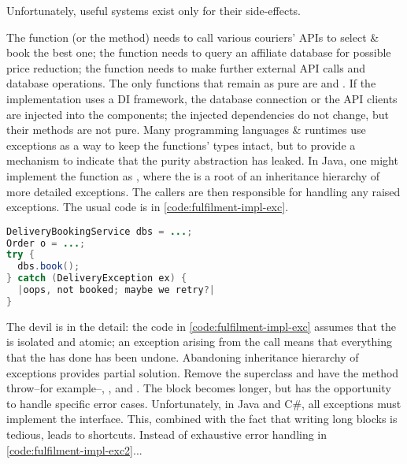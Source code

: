 Unfortunately, useful systems exist only for their side-effects.

The  function (or the  method) needs to call various couriers' APIs to select \& book the best one; the  function needs to query an affiliate database for possible price reduction; the  function needs to make further external API calls and database operations. The only functions that remain as pure are  and . If the implementation uses a DI framework, the database connection or the API clients are injected into the components; the injected dependencies do not change, but their methods are not pure. Many programming languages \& runtimes use exceptions as a way to keep the functions' types intact, but to provide a mechanism to indicate that the purity abstraction has leaked. In Java, one might implement the  function as , where the  is a root of an inheritance hierarchy of more detailed exceptions. The callers are then responsible for handling any raised exceptions. The usual code is in \autoref{code:fulfilment-impl-exc}.

\begin{lstlisting}[caption={Exceptions}, label={code:fulfilment-impl-exc}, language=Java, escapechar=|]
DeliveryBookingService dbs = ...;
Order o = ...;
try {
  dbs.book();
} catch (DeliveryException ex) {
  |oops, not booked; maybe we retry?|
}
\end{lstlisting}

The devil is in the detail: the code in \autoref{code:fulfilment-impl-exc} assumes that the  is isolated and atomic; an exception arising from the call means that everything that the  has done has been undone. Abandoning inheritance hierarchy of exceptions provides partial solution. Remove the  superclass and have the method throw--for example--, , and . The  block becomes longer, but has the opportunity to handle specific error cases. Unfortunately, in Java and C\#, all exceptions must implement the  interface. This, combined with the fact that writing long  blocks is tedious, leads to shortcuts. Instead of exhaustive error handling in \autoref{code:fulfilment-impl-exc2}...

